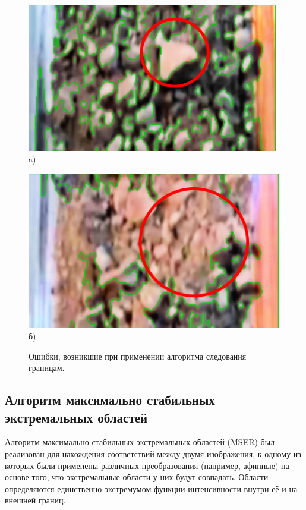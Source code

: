 \documentclass[times]{itmo-student-thesis}
\begin{document}
\begin{figure}[h]
	\begin{minipage}[h]{0.49\linewidth}
		\centering
			\includegraphics[width=0.9\linewidth]{images/findContour_profile} \\ a)
	\end{minipage}
	\hfill
	\begin{minipage}[h]{0.49\linewidth}
		\centering
		\includegraphics[width=0.9\linewidth]{images/findContours_sep} \\ б)
	\end{minipage}
	\caption{Ошибки, возникшие при применении алгоритма следования границам.}
	\label{ris:findContours}
\end{figure}



\subsection{Алгоритм максимально стабильных экстремальных областей}
Алгоритм максимально стабильных экстремальных областей (MSER) \cite{mser} был реализован для нахождения соответствий между двумя изображения, к одному из которых были применены различных преобразования (например, афинные) на основе того, что экстремальные области у них будут совпадать. Области определяются единственно экстремумом функции интенсивности внутри её и на внешней границ. 
\end{document}
